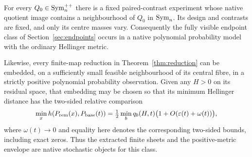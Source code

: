 \begin{corollary}\label{cor:every-native}
For every $Q_0\in\operatorname{Sym}_n^{++}$ there is a fixed paired-contrast experiment whose native quotient image contains a neighbourhood of $Q_0$ in $\operatorname{Sym}_n$. Its design and contrasts are fixed, and only its centre masses vary. Consequently the fully visible endpoint class of Section~\ref{sec:endpoints} occurs in a native polynomial probability model with the ordinary Hellinger metric.

Likewise, every finite-map reduction in Theorem~\ref{thm:reduction} can be embedded, on a sufficiently small feasible neighbourhood of its central fibre, in a strictly positive polynomial probability observation. Given any $H>0$ on its residual space, that embedding may be chosen so that its minimum Hellinger distance has the two-sided relative comparison
\[
 \min_x h(P_{\rm rem}(x),P_{\rm base}(t))
 =\tfrac12\min_b q_b(H,t)\bigl(1+O(\varepsilon(t)+\omega(t))\bigr),
\]
where $\omega(t)\to0$ and equality here denotes the corresponding two-sided bounds, including exact zeros. Thus the extracted finite sheets and the positive-metric envelope are native stochastic objects for this class.
\end{corollary}
